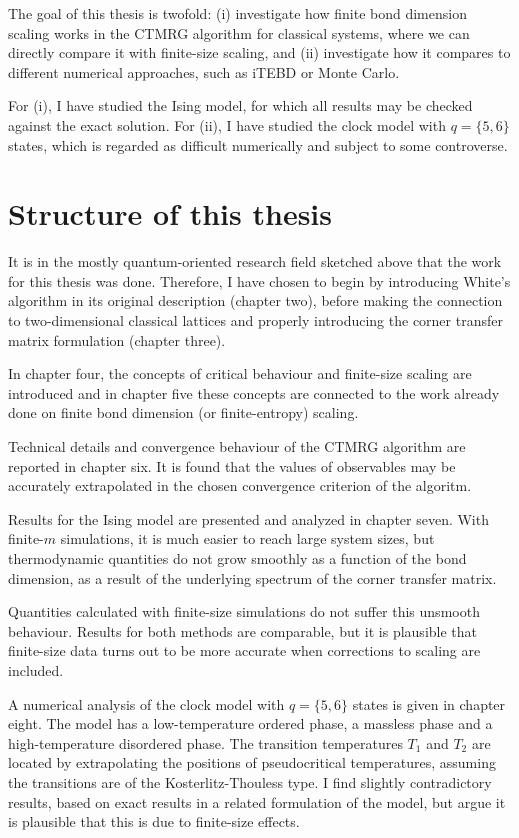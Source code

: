 The goal of this thesis is twofold: (i) investigate how finite bond
dimension scaling works in the CTMRG algorithm for classical systems,
where we can directly compare it with finite-size scaling, and (ii)
investigate how it compares to different numerical approaches, such as
iTEBD or Monte Carlo.

For (i), I have studied the Ising model, for which all results may be checked
against the exact solution. For (ii), I have studied the clock model with $q
= \{5,
6 \}$ states, which is regarded as difficult numerically and subject to some
controverse.

\section{Structure of this thesis}

It is in the mostly quantum-oriented research field sketched above that the
work for this thesis was done. Therefore, I have chosen to
begin by introducing White's algorithm in its original description
(chapter two), before making the connection to two-dimensional classical
lattices and properly introducing the corner transfer matrix formulation
(chapter three).

In chapter four, the concepts of critical behaviour and finite-size
scaling are introduced and in chapter five these concepts are connected to
the work already done on finite bond dimension (or finite-entropy)
scaling.

Technical details and convergence behaviour of the CTMRG algorithm are reported in chapter six.
It is found that the values of observables may be accurately extrapolated in the chosen convergence criterion of the
algoritm.

Results for the Ising model are presented and analyzed in chapter seven.
With finite-$m$ simulations, it is much easier to reach large system sizes,
but thermodynamic quantities do not grow smoothly as a function of the bond dimension,
as a result of the underlying spectrum of the corner transfer matrix.

Quantities calculated with finite-size simulations do not suffer this unsmooth behaviour.
Results for both methods are comparable, but it is plausible that finite-size data turns out to be more accurate when
corrections to scaling are included.

A numerical analysis of the clock model with $q = \{5, 6\}$ states is given in chapter eight.
The model has a low-temperature ordered phase, a massless phase and a high-temperature disordered phase.
The transition temperatures $T_1$ and $T_2$ are located by extrapolating the positions of pseudocritical temperatures,
assuming the transitions are of the Kosterlitz-Thouless type.
I find slightly contradictory results, based on exact results in a related formulation of the model,
but argue it is plausible that this is due to finite-size effects.
